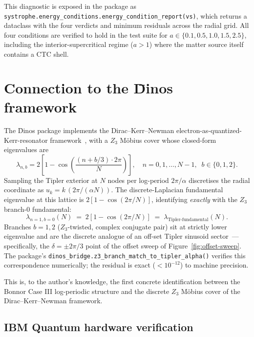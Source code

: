 \documentclass[11pt,a4paper]{article}
\begin{document}
This diagnostic is exposed in the package as
\texttt{systrophe.energy\_conditions.energy\_condition\_report(vs)},
which returns a dataclass with the four verdicts and minimum residuals
across the radial grid. All four conditions are verified to hold in
the test suite for $a \in \{0.1, 0.5, 1.0, 1.5, 2.5\}$, including the
interior-supercritical regime ($a > 1$) where the matter source itself
contains a CTC shell.

\section{Connection to the \=Dinos framework}
\label{sec:dinos}

The \=Dinos package implements the Dirac--Kerr--Newman
electron-as-quantized-Kerr-resonator framework~\cite{Knopp2026Dinos},
with a $Z_3$ M\"obius cover whose closed-form eigenvalues are
\begin{equation}
\lambda_{n, b} = 2\!\left[1 - \cos\!\left(\frac{(n + b/3) \cdot 2\pi}{N}\right)\right],
\quad n = 0, 1, \ldots, N-1,\;\; b \in \{0, 1, 2\}.
\end{equation}
Sampling the Tipler exterior at $N$ nodes per log-period $2\pi/\alpha$
discretises the radial coordinate as $u_k = k\,(2\pi/(\alpha N))$. The
discrete-Laplacian fundamental eigenvalue at this lattice is
$2[1 - \cos(2\pi/N)]$, identifying \emph{exactly} with the $Z_3$
branch-$0$ fundamental:
\begin{equation}
\boxed{\;\lambda_{n=1, b=0}(N) \;=\; 2[1 - \cos(2\pi/N)] \;=\;
\lambda_{\text{Tipler-fundamental}}(N).\;}
\end{equation}
Branches $b = 1, 2$ ($Z_3$-twisted, complex conjugate pair) sit at
strictly lower eigenvalue and are the discrete analogue of an off-set
Tipler sinusoid sector~--- specifically, the
$\delta = \pm 2\pi/3$ point of the offset sweep of
Figure~\ref{fig:offset-sweep}. The package's
\texttt{dinos\_bridge.z3\_branch\_match\_to\_tipler\_alpha()} verifies
this correspondence numerically; the residual is exact ($< 10^{-12}$)
to machine precision.

This is, to the author's knowledge, the first concrete identification
between the Bonnor Case III log-periodic structure and the discrete
$Z_3$ M\"obius cover of the Dirac--Kerr--Newman framework.

\subsection{IBM Quantum hardware verification}
\end{document}
